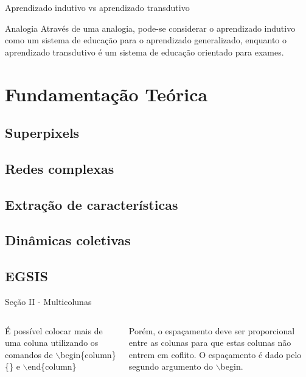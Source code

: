 \documentclass{templatebeamerufc/libs/ufc_format}
\begin{document}
\begin{frame}{Aprendizado indutivo vs aprendizado transdutivo}
  \begin{exampleblock}{Analogia}
     Através de uma analogia, pode-se considerar o aprendizado
indutivo como um sistema de educação para o aprendizado generalizado,
enquanto o aprendizado transdutivo é um sistema de educação orientado
para exames.
  \end{exampleblock}
\end{frame}


\section{Fundamentação Teórica}
\subsection{Superpixels}
\subsection{Redes complexas}
\subsection{Extração de características}
\subsection{Dinâmicas coletivas}
\subsection{EGSIS}
\begin{frame}{Seção II - Multicolunas}
    \begin{columns}{}
        \begin{column}{0.5\textwidth}
            \justify
            É possível colocar mais de uma coluna utilizando os comandos de $\backslash$begin\{column\}\{\} e $\backslash$end\{column\}
        \end{column}
        \begin{column}{0.5\textwidth}
            \justify
            Porém, o espaçamento deve ser proporcional entre as colunas para que estas colunas não entrem em coflito. O espaçamento é dado pelo segundo argumento do $\backslash$begin.
        \end{column}
    \end{columns}
\end{frame}
\end{document}

